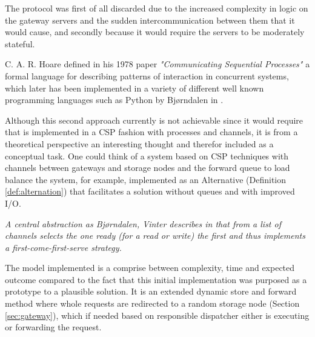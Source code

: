 The protocol was first of all discarded due to the increased complexity in logic on the gateway servers and the sudden intercommunication between them that it would cause, and secondly because it would require the servers to be moderately stateful.
\newline

C. A. R. Hoare defined in his 1978 paper \textit{"Communicating Sequential Processes"}\cite{Hoare:1978:CSP:359576.359585} a formal language for describing patterns of interaction in concurrent systems, which later has been implemented in a variety of different well known programming languages such as Python by Bj{\o}rndalen \etal in \cite{bjorndalen2007pycsp}.
\newline

\noindent
Although this second approach currently is not achievable since it would require that \CodeName is implemented in a CSP fashion with processes and channels, it is from a theoretical perspective an interesting thought and therefor included as a conceptual task. One could think of a \CodeName system based on CSP techniques with channels between gateways and storage nodes and the forward queue to load balance the system, for example, implemented as an Alternative (Definition \ref{def:alternation}) that facilitates a solution without queues and with improved I/O.
\vspace*{3mm}
\begin{definition} \label{def:alternation}
\textit{A central abstraction as Bj{\o}rndalen, Vinter \etal describes in \cite{bjorndalen2007pycsp} that from a list of channels selects the one ready (for a read or write) the first and thus implements a first-come-first-serve strategy.}
\end{definition}

The model implemented is a comprise between complexity, time and expected outcome compared to the fact that this initial \CodeName implementation was purposed as a prototype to a plausible solution. It is an extended dynamic store and forward method where whole requests are redirected to a random storage node (Section \ref{sec:gateway}), which if needed based on responsible dispatcher either is executing or forwarding the request. 
\newline

